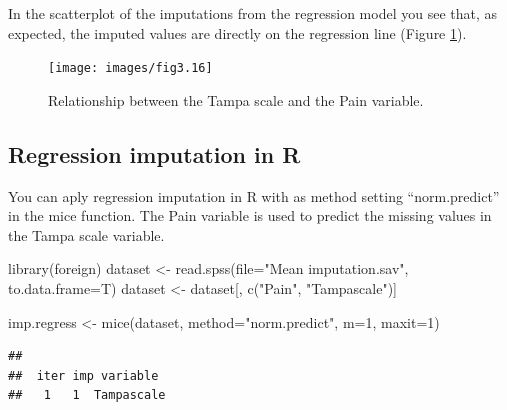 \documentclass[
]{book}
\newenvironment{Shaded}{\begin{snugshade}}{\end{snugshade}}
\newcommand{\AttributeTok}[1]{\textcolor[rgb]{0.77,0.63,0.00}{#1}}
\newcommand{\CommentTok}[1]{\textcolor[rgb]{0.56,0.35,0.01}{\textit{#1}}}
\newcommand{\DecValTok}[1]{\textcolor[rgb]{0.00,0.00,0.81}{#1}}
\newcommand{\FunctionTok}[1]{\textcolor[rgb]{0.00,0.00,0.00}{#1}}
\newcommand{\NormalTok}[1]{#1}
\newcommand{\OtherTok}[1]{\textcolor[rgb]{0.56,0.35,0.01}{#1}}
\newcommand{\SpecialCharTok}[1]{\textcolor[rgb]{0.00,0.00,0.00}{#1}}
\newcommand{\StringTok}[1]{\textcolor[rgb]{0.31,0.60,0.02}{#1}}
\begin{document}
In the scatterplot of the imputations from the regression model you see that, as expected, the imputed values are directly on the regression line (Figure \ref{fig:fig3-16}).

\begin{figure}

{\centering \texttt{[image: images/fig3.16]} 

}

\caption{Relationship between the Tampa scale and the Pain variable.}\label{fig:fig3-16}
\end{figure}

\hypertarget{regression-imputation-in-r}{%
\subsection{Regression imputation in R}\label{regression-imputation-in-r}}

You can aply regression imputation in R with as method setting ``norm.predict'' in the mice function. The Pain variable is used to predict the missing values in the Tampa scale variable.

\begin{Shaded}
\begin{Highlighting}[]
\FunctionTok{library}\NormalTok{(foreign)}
\NormalTok{dataset }\OtherTok{\textless{}{-}} \FunctionTok{read.spss}\NormalTok{(}\AttributeTok{file=}\StringTok{"Mean imputation.sav"}\NormalTok{, }\AttributeTok{to.data.frame=}\NormalTok{T)}
\NormalTok{dataset }\OtherTok{\textless{}{-}}\NormalTok{ dataset[, }\FunctionTok{c}\NormalTok{(}\StringTok{"Pain"}\NormalTok{, }\StringTok{"Tampascale"}\NormalTok{)]}

\NormalTok{imp.regress }\OtherTok{\textless{}{-}} \FunctionTok{mice}\NormalTok{(dataset, }\AttributeTok{method=}\StringTok{"norm.predict"}\NormalTok{, }\AttributeTok{m=}\DecValTok{1}\NormalTok{, }\AttributeTok{maxit=}\DecValTok{1}\NormalTok{)}
\end{Highlighting}
\end{Shaded}

\begin{verbatim}
## 
##  iter imp variable
##   1   1  Tampascale
\end{verbatim}

\begin{Shaded}
\end{Shaded}
\end{document}
